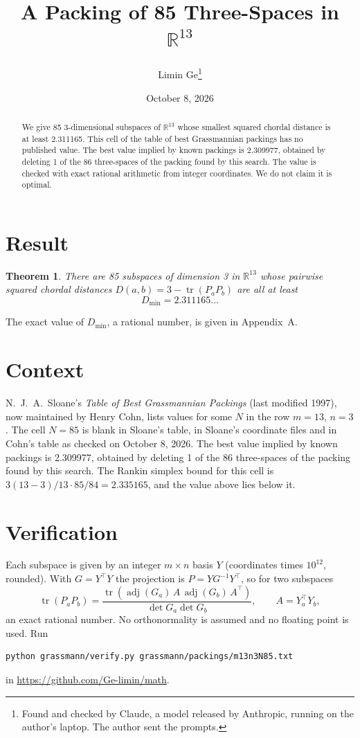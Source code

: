 \documentclass[11pt,a4paper]{article}
\title{A Packing of 85 Three-Spaces in $\mathbb{R}^{13}$}
\author{Limin Ge\thanks{Found and checked by Claude, a model released by Anthropic, running on the author's laptop. The author sent the prompts.}}
\date{October 8, 2026}
\newtheorem*{theorem}{Theorem}
\begin{document}
\maketitle
\begin{abstract}
We give 85 3-dimensional subspaces of $\mathbb{R}^{13}$ whose smallest squared chordal distance is at least 2.311165. This cell of the table of best Grassmannian packings has no published value. The best value implied by known packings is 2.309977, obtained by deleting 1 of the 86 three-spaces of the packing found by this search. The value is checked with exact rational arithmetic from integer coordinates. We do not claim it is optimal.
\end{abstract}

\section{Result}
\begin{theorem}
There are 85 subspaces of dimension 3 in $\mathbb{R}^{13}$ whose pairwise squared chordal distances $D(a,b) = 3 - \operatorname{tr}(P_aP_b)$ are all at least
\[ D_{\min} = 2.311165\ldots \]
\end{theorem}
The exact value of $D_{\min}$, a rational number, is given in Appendix~A.


\section{Context}
N.~J.~A.~Sloane's \emph{Table of Best Grassmannian Packings} (last modified 1997), now maintained by Henry Cohn, lists values for some $N$ in the row $m=13$, $n=3$. The cell $N=85$ is blank in Sloane's table, in Sloane's coordinate files and in Cohn's table as checked on October 8, 2026. The best value implied by known packings is 2.309977, obtained by deleting 1 of the 86 three-spaces of the packing found by this search. The Rankin simplex bound for this cell is $3(13-3)/13\cdot 85/84 = 2.335165$, and the value above lies below it.


\section{Verification}
Each subspace is given by an integer $m\times n$ basis $Y$ (coordinates times $10^{12}$, rounded). With $G=Y^\top Y$ the projection is $P=YG^{-1}Y^\top$, so for two subspaces
\[ \operatorname{tr}(P_aP_b)=\frac{\operatorname{tr}(\operatorname{adj}(G_a)\,A\,\operatorname{adj}(G_b)\,A^\top)}{\det G_a\det G_b},\qquad A=Y_a^\top Y_b, \]
an exact rational number. No orthonormality is assumed and no floating point is used. Run
\begin{verbatim}
python grassmann/verify.py grassmann/packings/m13n3N85.txt
\end{verbatim}
in \url{https://github.com/Ge-limin/math}.
\end{document}
